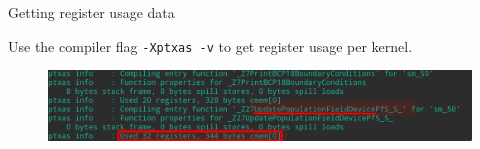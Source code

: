 \documentclass[9pt]{beamer}
\begin{document}
\begin{frame}{Getting register usage data}

Use the compiler flag \texttt{-Xptxas -v} to get register usage per kernel. 

\begin{figure}
\begin{center}
	\includegraphics[scale=0.30]{images/register_usage_highlighted.png}
\end{center}
\end{figure}
\end{frame}


\end{document}
